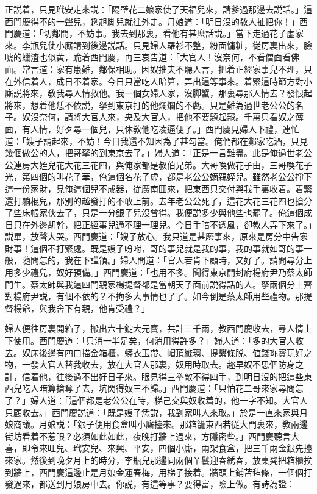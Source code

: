 正説着，只見玳安走來説：「隔壁花二娘家使了天福兒來，請爹過那邊去説話。」這西門慶得不的一聲兒，趔趄脚兒就往外走。月娘道：「明日沒的敎人扯把你！」西門慶道：「切鄰間，不妨事。我去到那裏，看他有甚麽話説。」當下走過花子虚家來。李瓶兒使小廝請到後邊説話。只見婦人羅衫不整，粉面慵粧，従房裏出來，臉唬的蠟渣也似黄，跪着西門慶，再三哀告道：「大官人！沒奈何，不看僧面看佛面。常言道：家有患難，鄰保相助。因奴拙夫不聽人言，把着正經家事兒不理，只在外信着人，成日不着家。今日只當吃人暗算，弄出這等事來。着緊這時節方對小廝説將來，敎我尋人情救他。我一個女婦人家，沒脚蟹，那裏尋那人情去？發恨起將來，想着他恁不依説，拏到東京打的他爛爛的不虧。只是難為過世老公公的名子。奴沒奈何，請將大官人來，央及大官人，把他不要題起罷。千萬只看奴之薄面，有人情，好歹尋一個兒，只休敎他吃凌逼便了。」西門慶見婦人下禮，連忙道：「嫂子請起來，不妨！今日我還不知因為了甚勾當。俺們都在鄭家吃酒，只見幾個做公的人，把哥拏的到東京去了。」婦人道：「正是一言難盡。此是俺過世老公公連房大姪兒花大花三花四，與俺家都是叔伯兄弟。大哥喚做花子由，三哥喚花子光，第四個的叫花子華，俺這個名花子虚，都是老公公嫡親姪兒。雖然老公公掙下這一份家財，見俺這個兒不成器，従廣南囬來，把東西只交付與我手裏收着。着緊還打躺棍兒，那別的越發打的不敢上前。去年老公公死了，這花大花三花四也搶分了些床帳家伙去了，只是一分銀子兒沒曾得。我便説多少與他些也罷了。俺這個成日只在外邊胡幹，把正經事兒通不理一理兒。今日手暗不透風，卻教人弄下來了。」説畢，放聲大哭。西門慶道：「嫂子放心。我只道是甚麽事來，原來是房分中告家財事！這個不打緊處。既是嫂子吩咐，哥的事兒就是我的事，我的事就如哥的事一般，隨問怎的，我在下謹領。」婦人問道：「官人若肯下顧時，又好了。請問尋分上用多少禮兒，奴好預備。」西門慶道：「也用不多。聞得東京開封府楊府尹乃蔡太師門生。蔡太師與我這四門親家楊提督都是當朝天子面前説得話的人。拏兩個分上齊對楊府尹説，有個不依的？不拘多大事情也了了。如今倒是蔡太師用些禮物。那提督楊爺，與我舍下有親，他肯受禮？」

婦人便往房裏開箱子，搬出六十錠大元寳，共計三千兩，教西門慶收去，尋人情上下使用。西門慶道：「只消一半足矣，何消用得許多？」婦人道：「多的大官人收去。奴床後邊有四口描金箱櫃，蟒衣玉帶、帽頂縧環、提繫條脱、値錢珎寳玩好之物，一發大官人替我收去，放在大官人那裏，奴用時取去。趂早奴不思個防身之計，信着他，往後過不出好日子來。眼見得三拳敵不得四手，到明日沒的把這些東西兒吃人暗算搶奪了去，坑閃得奴三不歸。」西門慶道：「只怕花二哥來家尋問怎了？」婦人道：「這個都是老公公在時，梯己交與奴收着的，他一字不知。大官人只顧收去。」西門慶説道：「既是嫂子恁説，我到家叫人來取。」於是一直來家與月娘商議。月娘説：「銀子便用食盒叫小廝擡來。那箱籠東西若従大門裏來，敎兩邊街坊看着不惹眼？必須如此如此，夜晚打牆上過來，方隱密些。」西門慶聽言大喜，即令來旺兒、玳安兒、來興、平安，四個小廝，兩架食盒，把三千兩金銀先擡來家。然後到晚夕月上的時分，李瓶兒那邊同兩個丫鬟迎春綉春，放桌凳把箱櫃挨到牆上，西門慶這邊止是月娘金蓮春梅，用梯子接着。牆頭上鋪苫毡條，一個個打發過來，都送到月娘房中去。你説，有這等事？要得富，險上做。有詩為證：

